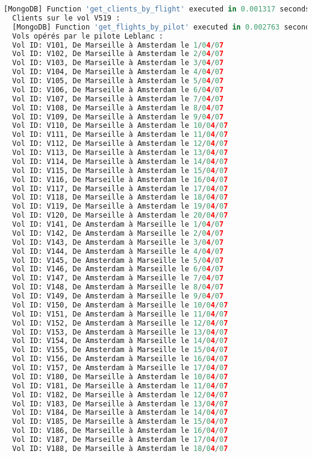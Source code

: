 \begin{lstlisting}[language=Python, caption=Résultats des requêtes, label=lst:results_queries]
  [MongoDB] Function 'get_clients_by_flight' executed in 0.001317 seconds
  Clients sur le vol V519 :
  [MongoDB] Function 'get_flights_by_pilot' executed in 0.002763 seconds
  Vols opérés par le pilote Leblanc :
  Vol ID: V101, De Marseille à Amsterdam le 1/04/07
  Vol ID: V102, De Marseille à Amsterdam le 2/04/07
  Vol ID: V103, De Marseille à Amsterdam le 3/04/07
  Vol ID: V104, De Marseille à Amsterdam le 4/04/07
  Vol ID: V105, De Marseille à Amsterdam le 5/04/07
  Vol ID: V106, De Marseille à Amsterdam le 6/04/07
  Vol ID: V107, De Marseille à Amsterdam le 7/04/07
  Vol ID: V108, De Marseille à Amsterdam le 8/04/07
  Vol ID: V109, De Marseille à Amsterdam le 9/04/07
  Vol ID: V110, De Marseille à Amsterdam le 10/04/07
  Vol ID: V111, De Marseille à Amsterdam le 11/04/07
  Vol ID: V112, De Marseille à Amsterdam le 12/04/07
  Vol ID: V113, De Marseille à Amsterdam le 13/04/07
  Vol ID: V114, De Marseille à Amsterdam le 14/04/07
  Vol ID: V115, De Marseille à Amsterdam le 15/04/07
  Vol ID: V116, De Marseille à Amsterdam le 16/04/07
  Vol ID: V117, De Marseille à Amsterdam le 17/04/07
  Vol ID: V118, De Marseille à Amsterdam le 18/04/07
  Vol ID: V119, De Marseille à Amsterdam le 19/04/07
  Vol ID: V120, De Marseille à Amsterdam le 20/04/07
  Vol ID: V141, De Amsterdam à Marseille le 1/04/07
  Vol ID: V142, De Amsterdam à Marseille le 2/04/07
  Vol ID: V143, De Amsterdam à Marseille le 3/04/07
  Vol ID: V144, De Amsterdam à Marseille le 4/04/07
  Vol ID: V145, De Amsterdam à Marseille le 5/04/07
  Vol ID: V146, De Amsterdam à Marseille le 6/04/07
  Vol ID: V147, De Amsterdam à Marseille le 7/04/07
  Vol ID: V148, De Amsterdam à Marseille le 8/04/07
  Vol ID: V149, De Amsterdam à Marseille le 9/04/07
  Vol ID: V150, De Amsterdam à Marseille le 10/04/07
  Vol ID: V151, De Amsterdam à Marseille le 11/04/07
  Vol ID: V152, De Amsterdam à Marseille le 12/04/07
  Vol ID: V153, De Amsterdam à Marseille le 13/04/07
  Vol ID: V154, De Amsterdam à Marseille le 14/04/07
  Vol ID: V155, De Amsterdam à Marseille le 15/04/07
  Vol ID: V156, De Amsterdam à Marseille le 16/04/07
  Vol ID: V157, De Amsterdam à Marseille le 17/04/07
  Vol ID: V180, De Marseille à Amsterdam le 10/04/07
  Vol ID: V181, De Marseille à Amsterdam le 11/04/07
  Vol ID: V182, De Marseille à Amsterdam le 12/04/07
  Vol ID: V183, De Marseille à Amsterdam le 13/04/07
  Vol ID: V184, De Marseille à Amsterdam le 14/04/07
  Vol ID: V185, De Marseille à Amsterdam le 15/04/07
  Vol ID: V186, De Marseille à Amsterdam le 16/04/07
  Vol ID: V187, De Marseille à Amsterdam le 17/04/07
  Vol ID: V188, De Marseille à Amsterdam le 18/04/07

\end{lstlisting}
